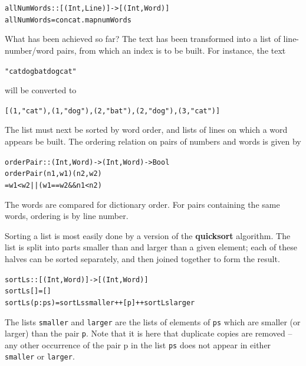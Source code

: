 \begin{alltt}
allNumWords :: [ ( Int , Line ) ] -> [ ( Int , Word ) ]
allNumWords = concat . map numWords
\end{alltt}
What has been achieved so far? The text has been transformed into a list of
line-number/word pairs, from which an index is to be built. For instance,
the text
\begin{alltt}
"cat dogbat dogcat"
\end{alltt}
will be converted to
\begin{alltt}
[(1,"cat") , (1,"dog") , (2,"bat") , (2,"dog") , (3,"cat")]
\end{alltt}
The list must next be
sorted by word order, and lists of lines on which a word appears be built.
The ordering relation on pairs of numbers and 
words is given by
\begin{alltt}
orderPair :: ( Int , Word ) -> ( Int , Word ) -> Bool
orderPair ( n1 , w1 ) ( n2 , w2 )
  = w1 < w2 || ( w1 == w2 \&\& n1 < n2 )
\end{alltt}
The words are compared for dictionary order. For pairs containing the same
words, ordering is by line number.

Sorting a list is most easily done by a version of the \textbf{quicksort} algorithm. The list is split into parts smaller than and larger
than a given element; each of these halves can be sorted separately, and
then joined together to form the result. 

\label{sortLs}\begin{alltt}
sortLs :: [ ( Int , Word ) ] -> [ ( Int , Word ) ]
\bl
sortLs []     = []
sortLs (p:ps) = sortLs smaller ++ [p] ++ sortLs larger
\end{alltt}
The lists \texttt{smaller} and \texttt{larger} are the lists of elements of \texttt{ps}
which are smaller (or larger) than the pair \texttt{p}. Note that it is here
that duplicate copies are removed -- any other occurrence of the pair {\mi
p} in the list \texttt{ps} does not appear in either \texttt{smaller} or \texttt{larger}.

